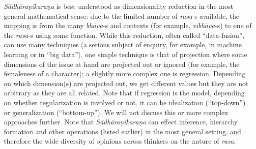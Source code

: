 \textsl{Sādhāraṇīkaraṇa} is best understood as dimensionality reduction in the most general mathematical sense: due to the limited number of \textsl{rasa}-s available, the mapping is from the many \textsl{bhāva}-s and contexts (for example, \textsl{vibhāva}-s) to one of the \textsl{rasa}-s using some function. While this reduction, often called ``data-fusion'', can use many techniques (a serious subject of enquiry, for example, in machine learning or in “big data”), one simple technique is that of projection where some dimensions of the issue at hand are projected out or ignored (for example, the femaleness of a character); a slightly more complex one is regression. Depending on which dimension(s) are projected out, we get different values but they are not arbitrary as they are all related. Note that if regression is the model, depending on whether regularization is involved or not, it can be idealization (“top-down”) or generalization (“bottom-up”). We will not discuss this or more complex approaches further. Note that \textsl{Sādhāraṇīkaraṇa} can effect inference, hierarchy formation and other operations (listed earlier) in the most general setting, and therefore the wide diversity of opinions across thinkers on the nature of \textsl{rasa}.


\newpage

